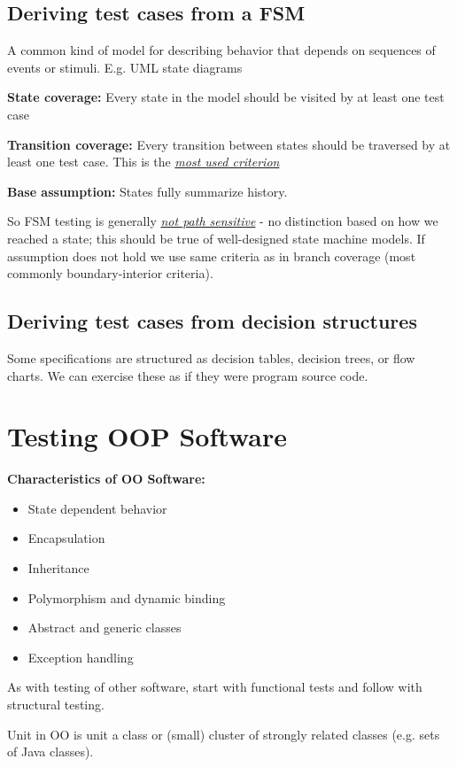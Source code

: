 \documentclass{article}
\begin{document}
\subsection{Deriving test cases from a FSM}
A common kind of model for describing behavior that depends on sequences of events or stimuli. E.g. UML state diagrams

\textbf{State coverage:} Every state in the model should be visited by at least one test case

\textbf{Transition coverage:} Every transition between states should be traversed by at least one test case. This is the \textit{\underline{most used criterion}}


\textbf{Base assumption:} States fully summarize history. 

So FSM testing is generally \textit{\underline{not path sensitive}} - no distinction based on how we reached a state; this should be true of well-designed state machine models. If assumption does not hold we use same criteria as in branch coverage (most commonly boundary-interior criteria).

\subsection{Deriving test cases from decision structures}
Some specifications are structured as decision tables, decision trees, or flow charts. We can exercise these as if they were program source code.


\section{Testing OOP Software}

\textbf{Characteristics of OO Software:}
\begin{itemize}
  \item State dependent behavior
  \item  Encapsulation
  \item  Inheritance
   \item Polymorphism and dynamic binding
  \item  Abstract and generic classes
  \item  Exception handling
\end{itemize}

As with testing of other software, start with functional tests and follow with structural testing.

Unit in OO is unit a class or (small) cluster of strongly related classes (e.g. sets of Java classes).
\end{document}
